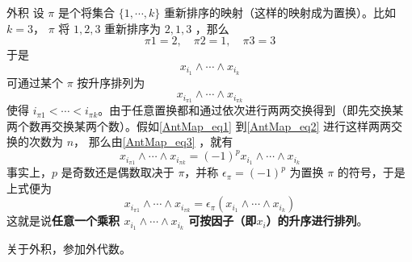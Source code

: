 \begin{example}{外积}
设 $\pi$ 是个将集合 $\{1,\cdots,k\}$ 重新排序的映射（这样的映射成为置换）。比如$k=3$， $\pi$ 将 $1,2,3$ 重新排序为 $2,1,3$ ，那么
\begin{equation}
\pi 1=2,\quad\pi2=1,\quad \pi3=3
\end{equation}
于是
\begin{equation}\label{AntMap_eq1}
x_{i_1}\wedge\cdots\wedge x_{i_k}
\end{equation}
可通过某个 $\pi$ 按升序排列为
\begin{equation}\label{AntMap_eq2}
x_{i_{\pi1}}\wedge\cdots\wedge x_{i_{\pi k}}
\end{equation}
使得 $i_{\pi1}<\cdots< i_{\pi k}$。由于任意置换都和通过依次进行两两交换得到（即先交换某两个数再交换某两个数）。假如\autoref{AntMap_eq1} 到\autoref{AntMap_eq2} 进行这样两两交换的次数为 $n$，
那么由\autoref{AntMap_eq3} ，就有
\begin{equation}
x_{i_{\pi1}}\wedge\cdots\wedge x_{i_{\pi k}}=(-1)^p x_{i_1}\wedge\cdots\wedge x_{i_k}
\end{equation}
事实上，$p$ 是奇数还是偶数取决于 $\pi$，并称 $\epsilon_\pi=(-1)^p$ 为置换 $\pi$ 的符号，于是上式便为
\begin{equation}
x_{i_{\pi1}}\wedge\cdots\wedge x_{i_{\pi k}}=\epsilon_\pi (x_{i_1}\wedge\cdots\wedge x_{i_k})
\end{equation}
这就是说\textbf{任意一个乘积 $x_{i_1}\wedge\cdots\wedge x_{i_k}$ 可按因子（即$x_i$）的升序进行排列}。

关于外积，参加外代数。
\end{example}
